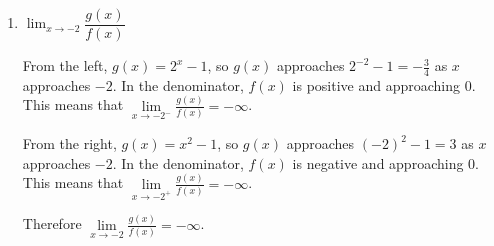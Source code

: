 \documentclass{article}
\begin{document}
\begin{enumerate}
\begin{enumerate}
  \item
    \begin{problem}[\vfill\newpage]
      $\displaystyle \lim_{x \to -2} \dfrac{g(x)}{f(x)}$
    \end{problem}

    \begin{solution}
      From the left, $g(x)=2^x-1$, so $g(x)$ approaches $2^{-2}-1 = -\frac{3}{4}$ as 
      $x$ approaches $-2$. In the denominator, $f(x)$ is positive and approaching $0$.
      This means that $\lim\limits_{x\to-2^-} \frac{g(x)}{f(x)} = -\infty$.

      From the right, $g(x)=x^2-1$, so $g(x)$ approaches $(-2)^2-1=3$ as $x$ approaches
      $-2$. In the denominator, $f(x)$ is negative and approaching $0$.
      This means that $\lim\limits_{x\to-2^+} \frac{g(x)}{f(x)} = -\infty$.

      Therefore $\lim\limits_{x\to-2} \frac{g(x)}{f(x)} = -\infty$.
    \end{solution}

  \end{enumerate}

\end{enumerate}
\end{document}
